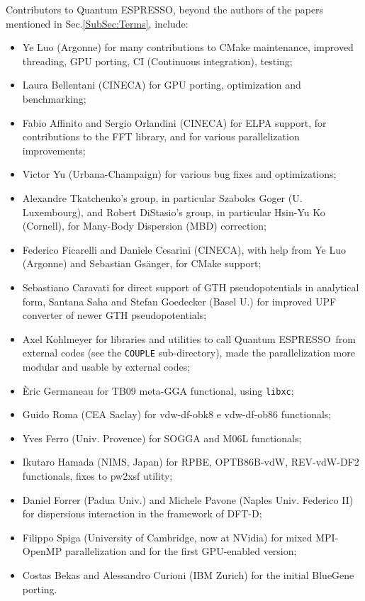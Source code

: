 \documentclass[12pt,a4paper]{article}
\def\qe{{\sc Quantum ESPRESSO}}
\def\libxc{\texttt{libxc}}
\begin{document}
Contributors to \qe, beyond the authors of the papers
mentioned in Sec.\ref{SubSec:Terms}, include:
\begin{itemize}
  \item Ye Luo (Argonne) for many contributions to CMake maintenance,
  improved threading, GPU porting, CI (Continuous integration), testing;
  \item Laura Bellentani (CINECA) for GPU porting, optimization 
  and benchmarking;
  \item Fabio Affinito and Sergio Orlandini (CINECA) for ELPA support, 
  for contributions to the FFT library, and for various parallelization
  improvements;
  \item Victor Yu (Urbana-Champaign) for various bug fixes and
	optimizations;
  \item Alexandre Tkatchenko's group, in particular Szabolcs Goger
  (U. Luxembourg), and Robert DiStasio's group, in particular
  Hsin-Yu Ko (Cornell), for Many-Body Dispersion (MBD) correction;
  \item Federico Ficarelli and Daniele Cesarini (CINECA), with help
  from Ye Luo (Argonne) and Sebastian Gs\"anger, for CMake support;
  \item Sebastiano Caravati for direct support of GTH pseudopotentials
  in analytical form, Santana Saha and Stefan Goedecker (Basel U.)
  for improved UPF converter of newer GTH pseudopotentials;
  \item Axel Kohlmeyer for libraries and utilities to call \qe\
  from external codes (see the \texttt{COUPLE} sub-directory), made the
  parallelization more modular and usable by external codes;
  \item \`Eric Germaneau for TB09 meta-GGA functional, using \libxc;
  \item Guido Roma (CEA Saclay) for  vdw-df-obk8  e vdw-df-ob86 functionals;
  \item Yves Ferro (Univ. Provence) for SOGGA and M06L functionals;
  \item Ikutaro Hamada (NIMS, Japan) for RPBE, OPTB86B-vdW, REV-vdW-DF2
	  functionals, fixes to pw2xsf utility;
  \item Daniel Forrer (Padua Univ.) and Michele Pavone
        (Naples Univ. Federico II) for dispersions interaction in the
        framework of DFT-D;
\item Filippo Spiga (University of Cambridge, now at NVidia)
  for mixed MPI-OpenMP parallelization and for the first
  GPU-enabled version;
  \item Costas Bekas and Alessandro Curioni (IBM Zurich) for the initial
  BlueGene porting.
\end{itemize}
\end{document}
